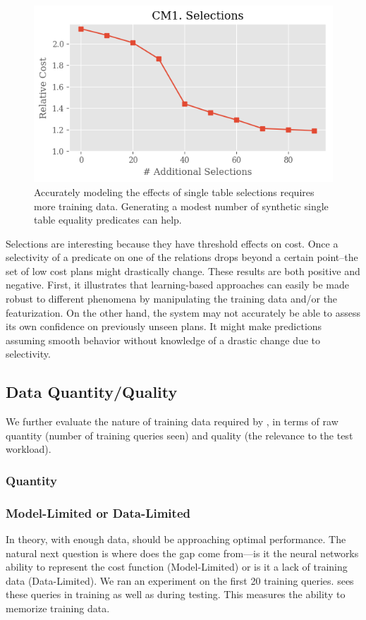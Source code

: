 \begin{figure}
    \centering
    \includegraphics[width=0.8\columnwidth]{exp/exp1_plot1.png}
    \caption{Accurately modeling the effects of single table selections requires more training data. Generating a modest number of synthetic single table equality predicates can help. \label{exp:plot1}}
\end{figure}

Selections are interesting because they have threshold effects on cost. Once a selectivity of a predicate on one of the relations drops beyond a certain point--the set of low cost plans might drastically change. These results are both positive and negative. First, it illustrates that learning-based approaches can easily be made robust to different phenomena by manipulating the training data and/or the featurization. On the other hand, the system may not accurately be able to assess its own confidence on previously unseen plans. It might make predictions assuming smooth behavior without knowledge of a drastic change due to selectivity. 

\subsection{Data Quantity/Quality}
We further evaluate the nature of training data required by \sys, in terms of raw quantity (number of training queries seen) and quality (the relevance to the test workload).

\subsubsection{Quantity}


\subsubsection{Model-Limited or Data-Limited}
In theory, with enough data, \sys should be approaching optimal performance.
The natural next question is where does the gap come from---is it the neural networks ability to represent the cost function (Model-Limited) or is it a lack of training data (Data-Limited).
We ran an experiment on the first 20 training queries. \sys sees these queries in training as well as during testing. This measures the ability to memorize training data.




